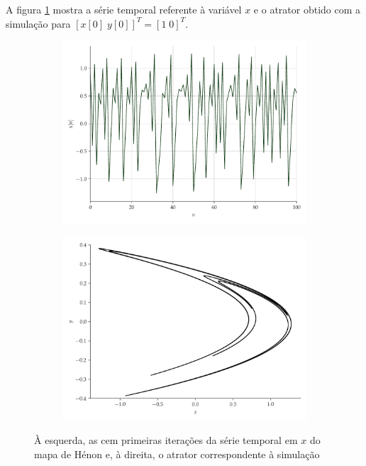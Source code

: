 \documentclass[a4paper, 12pt]{article}
\begin{document}
A figura \ref{fig:henon} mostra a série temporal referente à variável $x$ e o atrator obtido com a simulação para $[x[0]\; y[0]]^T = [1\; 0]^T$.
\begin{figure}[H]
     \begin{subfigure}[t]{0.35\textwidth}
         \includegraphics[scale=0.35]{serie-henon-x.pdf}
     \end{subfigure}
     \centering
     \begin{subfigure}[t]{0.35\textwidth}
         \includegraphics[scale=0.35]{mapa-de-henon.png}
     \end{subfigure}
     \caption{À esquerda, as cem primeiras iterações da série temporal em $x$ do mapa de Hénon e, à direita, o atrator correspondente à simulação}
     \label{fig:henon}
\end{figure}
\end{document}
